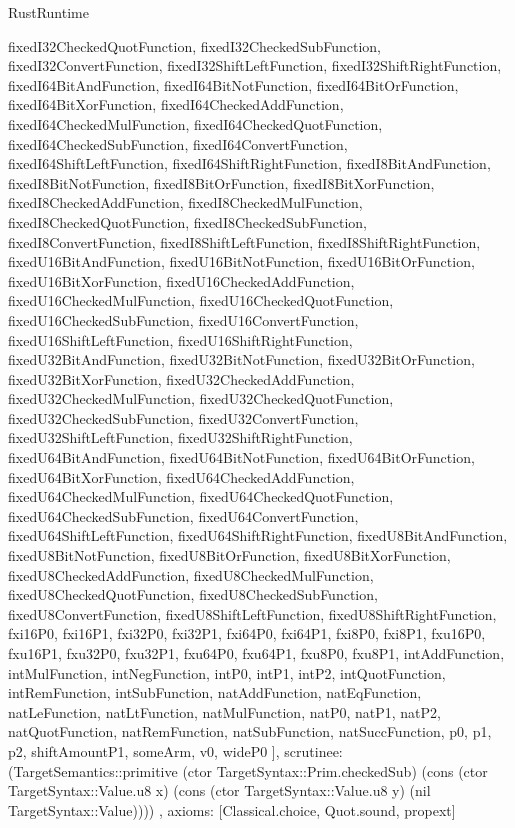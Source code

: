 \begin{lexlean}{RustRuntime}
\begin{semanticmodule}
{{      fixedI32CheckedQuotFunction,
      fixedI32CheckedSubFunction,
      fixedI32ConvertFunction,
      fixedI32ShiftLeftFunction,
      fixedI32ShiftRightFunction,
      fixedI64BitAndFunction,
      fixedI64BitNotFunction,
      fixedI64BitOrFunction,
      fixedI64BitXorFunction,
      fixedI64CheckedAddFunction,
      fixedI64CheckedMulFunction,
      fixedI64CheckedQuotFunction,
      fixedI64CheckedSubFunction,
      fixedI64ConvertFunction,
      fixedI64ShiftLeftFunction,
      fixedI64ShiftRightFunction,
      fixedI8BitAndFunction,
      fixedI8BitNotFunction,
      fixedI8BitOrFunction,
      fixedI8BitXorFunction,
      fixedI8CheckedAddFunction,
      fixedI8CheckedMulFunction,
      fixedI8CheckedQuotFunction,
      fixedI8CheckedSubFunction,
      fixedI8ConvertFunction,
      fixedI8ShiftLeftFunction,
      fixedI8ShiftRightFunction,
      fixedU16BitAndFunction,
      fixedU16BitNotFunction,
      fixedU16BitOrFunction,
      fixedU16BitXorFunction,
      fixedU16CheckedAddFunction,
      fixedU16CheckedMulFunction,
      fixedU16CheckedQuotFunction,
      fixedU16CheckedSubFunction,
      fixedU16ConvertFunction,
      fixedU16ShiftLeftFunction,
      fixedU16ShiftRightFunction,
      fixedU32BitAndFunction,
      fixedU32BitNotFunction,
      fixedU32BitOrFunction,
      fixedU32BitXorFunction,
      fixedU32CheckedAddFunction,
      fixedU32CheckedMulFunction,
      fixedU32CheckedQuotFunction,
      fixedU32CheckedSubFunction,
      fixedU32ConvertFunction,
      fixedU32ShiftLeftFunction,
      fixedU32ShiftRightFunction,
      fixedU64BitAndFunction,
      fixedU64BitNotFunction,
      fixedU64BitOrFunction,
      fixedU64BitXorFunction,
      fixedU64CheckedAddFunction,
      fixedU64CheckedMulFunction,
      fixedU64CheckedQuotFunction,
      fixedU64CheckedSubFunction,
      fixedU64ConvertFunction,
      fixedU64ShiftLeftFunction,
      fixedU64ShiftRightFunction,
      fixedU8BitAndFunction,
      fixedU8BitNotFunction,
      fixedU8BitOrFunction,
      fixedU8BitXorFunction,
      fixedU8CheckedAddFunction,
      fixedU8CheckedMulFunction,
      fixedU8CheckedQuotFunction,
      fixedU8CheckedSubFunction,
      fixedU8ConvertFunction,
      fixedU8ShiftLeftFunction,
      fixedU8ShiftRightFunction,
      fxi16P0,
      fxi16P1,
      fxi32P0,
      fxi32P1,
      fxi64P0,
      fxi64P1,
      fxi8P0,
      fxi8P1,
      fxu16P0,
      fxu16P1,
      fxu32P0,
      fxu32P1,
      fxu64P0,
      fxu64P1,
      fxu8P0,
      fxu8P1,
      intAddFunction,
      intMulFunction,
      intNegFunction,
      intP0,
      intP1,
      intP2,
      intQuotFunction,
      intRemFunction,
      intSubFunction,
      natAddFunction,
      natEqFunction,
      natLeFunction,
      natLtFunction,
      natMulFunction,
      natP0,
      natP1,
      natP2,
      natQuotFunction,
      natRemFunction,
      natSubFunction,
      natSuccFunction,
      p0,
      p1,
      p2,
      shiftAmountP1,
      someArm,
      v0,
      wideP0
    ],
    scrutinee: (TargetSemantics::primitive (ctor TargetSyntax::Prim.checkedSub) (cons (ctor TargetSyntax::Value.u8 x) (cons (ctor TargetSyntax::Value.u8 y) (nil TargetSyntax::Value))))
  },
  axioms: [Classical.choice, Quot.sound, propext]
}


\end{semanticmodule}
\end{lexlean}
